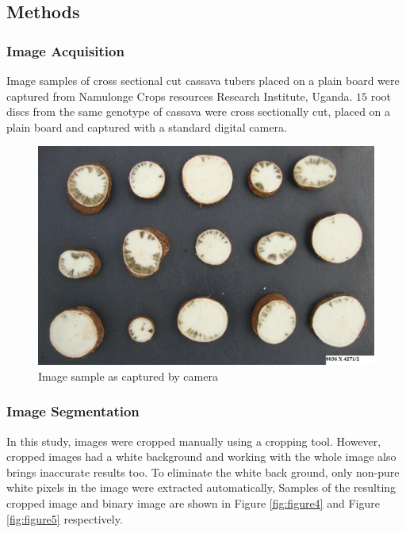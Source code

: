 \documentclass[conference]{IEEEtran}
\begin{document}



\subsection{Methods}
\subsubsection{Image Acquisition}
Image samples of cross sectional cut cassava tubers placed on a plain board were captured from Namulonge Crops resources Research Institute, Uganda. $15$ root discs from the same genotype of cassava were cross sectionally cut, placed on a plain board and captured with a standard digital camera.

\begin{figure}[t!]
\centering
\includegraphics[scale=0.15]{images/cassava1.jpg}
\caption{Image sample as captured by camera}
\label{fig:figure3}
\end{figure}


\subsubsection{Image Segmentation}
In this study, images were cropped manually using a cropping tool. However, cropped images had a white background and working with the whole image also brings inaccurate results too. To eliminate the white back ground, only non-pure white pixels in the image were extracted automatically, Samples of the resulting cropped image and binary image are shown in Figure \ref{fig:figure4} and Figure \ref{fig:figure5} respectively.
\end{document}
